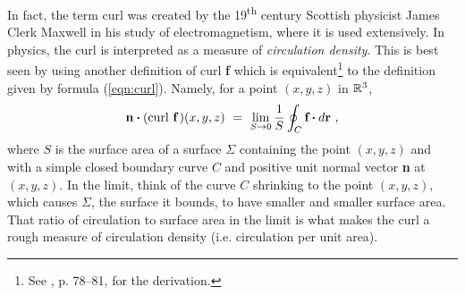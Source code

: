 In fact, the term curl was created by the 19\textsuperscript{th} century Scottish physicist James Clerk Maxwell in his
study of electromagnetism, where it is used extensively. In physics, the curl is interpreted as a measure of
\emph{circulation density}. This is best seen by using another definition of curl \textbf{f} which is
equivalent\footnote{See \cite{sch}, p. 78--81, for the derivation.} to the definition given by
formula (\ref{eqn:curl}). Namely, for a point $(x,y,z)$ in $\mathbb{R}^{3}$,
\begin{equation}\label{eqn:curlalt}
 \textbf{n} \bm{\cdot} (\text{curl}~\textbf{f}\,)(x,y,z) ~=~ \lim_{S \to 0} \frac{1}{S} \oint_{C} \textbf{f} \bm{\cdot} d\textbf{r} ~,
\end{equation}
where $S$ is the surface area of a surface $\Sigma$ containing the point $(x,y,z)$ and with a simple closed boundary
curve $C$ and positive unit normal vector \textbf{n} at $(x,y,z)$. In the limit, think of the curve $C$ shrinking to
the point $(x,y,z)$, which causes $\Sigma$, the surface it bounds, to have smaller and smaller surface area. That ratio
of circulation to surface area in the limit is what makes the curl a rough measure of circulation density (i.e.
circulation per unit area).

